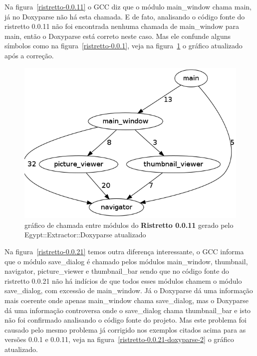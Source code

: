 Na figura~\ref{ristretto-0.0.11} o GCC diz que o módulo main\_window chama
main, já no Doxyparse não há esta chamada. E de fato, analisando o código fonte
do ristretto 0.0.11 não foi encontrada nenhuma chamada de main\_window para
main, então o Doxyparse está correto neste caso. Mas ele confunde alguns
símbolos como na figura~\ref{ristretto-0.0.1}, veja na
figura~\ref{ristretto-0.0.11-doxyparse-2} o gráfico atualizado após a correção.

\begin{figure}
\center
\includegraphics[scale=0.3]{imagens/ristretto-0_0_11-doxyparse-2}
\caption{gráfico de chamada entre módulos do {\bf Ristretto 0.0.11} gerado pelo Egypt::Extractor::Doxyparse atualizado}
\label{ristretto-0.0.11-doxyparse-2}
\end{figure}

Na figura~\ref{ristretto-0.0.21} temos outra diferença interessante, o GCC
informa que o módulo save\_dialog é chamado pelos módulos main\_window,
thumbnail, navigator, picture\_viewer e thumbnail\_bar sendo que no código
fonte do ristretto 0.0.21 não há indícios de que todos esses módulos chamem o
módulo save\_dialog, com excessão de main\_window. Já o Doxyparse dá uma
informação mais coerente onde apenas main\_window chama save\_dialog, mas o
Doxyparse dá uma informação controversa onde o save\_dialog chama
thumbnail\_bar e isto não foi confirmado analisando o código fonte do projeto.
Mas este problema foi causado pelo mesmo problema já corrigido nos exemplos
citados acima para as versões 0.0.1 e 0.0.11, veja na
figura~\ref{ristretto-0.0.21-doxyparse-2} o gráfico atualizado.

